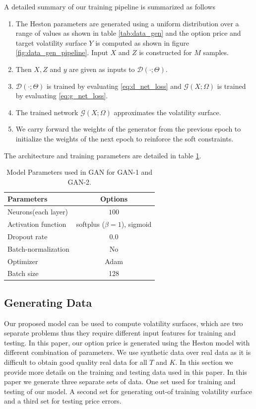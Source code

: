 \documentclass{article}
\theoremstyle{plain}%
\theoremstyle{definition}
\theoremstyle{remark}
\begin{document}
A detailed summary of our training pipeline is summarized as follows
\begin{enumerate}
\item The Heston parameters are generated using a uniform distribution over a range of values as shown in table \ref{tab:data_gen} and the option price and target volatility surface $Y$ is computed as shown in figure \ref{fig:data_gen_pipeline}. Input $X$ and $Z$ is constructed for $M$ samples. 
\item Then $X, Z$ and $y$ are given as inputs to $\mathcal{D}(\cdot;\Theta)$.
\item $\mathcal{D}(\cdot;\Theta)$ is trained by evaluating \eqref{eq:d_net_loss} and $\mathcal{G}(X;\Omega)$ is trained by evaluating \eqref{eq:g_net_loss}.
\item The trained network $\mathcal{G}(X;\Omega)$ approximates the volatility surface.
\item We carry forward the weights of the generator from the previous epoch to initialize the weights of the next epoch to reinforce the soft constraints.
\end{enumerate}
The architecture and training parameters are detailed in table \ref{tab:model_info}.
\begin{table}[!htbp]
\centering
\caption{Model Parameters used in GAN for GAN-1 and GAN-2.}
\begin{tabular}{lc}
\hline
\textbf{Parameters} & \textbf{Options}  \\
\hline
Neurons(each layer) & $100$ \\
Activation function & softplus ($\beta=1$), sigmoid\\
Dropout rate & $0.0$ \\
Batch-normalization & No \\
Optimizer & Adam \citep{kingma-2014} \\
Batch size & 128 \\
\hline
\end{tabular}
\label{tab:model_info}
\end{table}
\subsection{Generating Data}\label{sec:data}
Our proposed model can be used to compute volatility surfaces, which are two separate problems thus they require different input features for training and testing. In this paper, our option price is generated using the Heston model with different combination of parameters. We use synthetic data over real data as it is difficult to obtain good quality real data for all $T$ and $K$. In this section we provide more details on the training and testing data used in this paper. In this paper we generate three separate sets of data. One set used for training and testing of our model. A second set for generating out-of training volatility surface and a third set for testing price errors.
\end{document}
